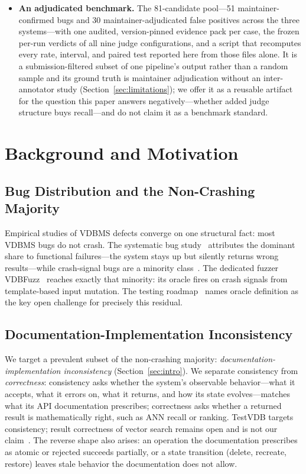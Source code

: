 \documentclass[acmsmall,screen,review,anonymous]{acmart}
\newcommand{\system}{TestVDB}
\begin{document}
\begin{itemize}
  \item \textbf{An adjudicated benchmark.} The 81-candidate pool---51 maintainer-confirmed bugs and 30 maintainer-adjudicated false positives across the three systems---with one audited, version-pinned evidence pack per case, the frozen per-run verdicts of all nine judge configurations, and a script that recomputes every rate, interval, and paired test reported here from those files alone. It is a submission-filtered subset of one pipeline's output rather than a random sample and its ground truth is maintainer adjudication without an inter-annotator study (Section~\ref{sec:limitations}); we offer it as a reusable artifact for the question this paper answers negatively---whether added judge structure buys recall---and do not claim it as a benchmark standard.
\end{itemize}

\section{Background and Motivation}
\label{sec:prelim}

\subsection{Bug Distribution and the Non-Crashing Majority}
\label{subsec:bugs}

Empirical studies of VDBMS defects converge on one structural fact: most VDBMS bugs do not crash. The systematic bug study~\cite{bugstudy25} attributes the dominant share to functional failures---the system stays up but silently returns wrong results---while crash-signal bugs are a minority class~\cite{bugstudy25,roadmap25}. The dedicated fuzzer VDBFuzz~\cite{vdbfuzz26} reaches exactly that minority: its oracle fires on crash signals from template-based input mutation. The testing roadmap~\cite{roadmap25} names oracle definition as the key open challenge for precisely this residual.

\subsection{Documentation-Implementation Inconsistency}
\label{subsec:consistency}

We target a prevalent subset of the non-crashing majority: \emph{documentation-implementation inconsistency} (Section~\ref{sec:intro}). We separate consistency from \emph{correctness}: consistency asks whether the system's observable behavior---what it accepts, what it errors on, what it returns, and how its state evolves---matches what its API documentation prescribes; correctness asks whether a returned result is mathematically right, such as ANN recall or ranking. \system{} targets consistency; result correctness of vector search remains open and is not our claim~\cite{roadmap25}. The reverse shape also arises: an operation the documentation prescribes as atomic or rejected succeeds partially, or a state transition (delete, recreate, restore) leaves stale behavior the documentation does not allow.
\end{document}
